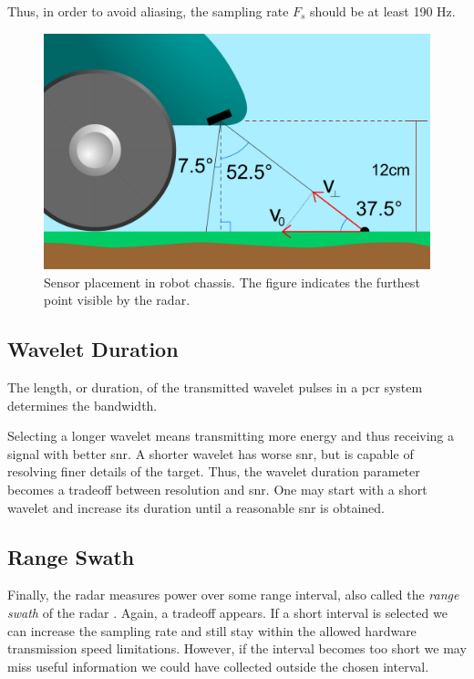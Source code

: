 Thus, in order to avoid aliasing, the sampling rate $F_s$ should be at least 190 Hz. 


\begin{figure}[h]
	\centering
	\includegraphics[scale=0.30]{figs_temp/sensor_placement.jpg}
	\caption{Sensor placement in robot chassis. The figure indicates the furthest point visible by the radar.}
	\label{fig:sensor_placement}
\end{figure}
\subsection{Wavelet Duration}

The length, or duration, of the transmitted wavelet pulses in a \gls{pcr} system determines the bandwidth. 

Selecting a longer wavelet means transmitting more energy and thus receiving a signal with better \gls{snr}. A shorter wavelet has worse \gls{snr}, but is capable of resolving finer details of the target. Thus, the wavelet duration parameter becomes a tradeoff between resolution and \gls{snr}. One may start with a short wavelet and increase its duration until a reasonable \gls{snr} is obtained.  

\subsection{Range Swath}

Finally, the radar measures power over some range interval, also called the \emph{range swath} of the radar \citep{richards_2014}. Again, a tradeoff appears. If a short interval is selected we can increase the sampling rate and still stay within the allowed hardware transmission speed limitations. However, if the interval becomes too short we may miss useful information we could have collected outside the chosen interval. 

